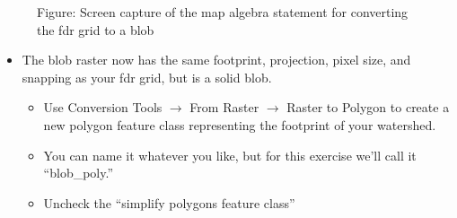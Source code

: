 \documentclass[letterpaper,10pt,english]{sphinxmanual}
\begin{document}
\begin{figure}[htbp]
\centering
\capstart

\noindent{}
\caption{Figure: Screen capture of the map algebra statement for converting the fdr grid to a blob}\label{\detokenize{ex_2:id17}}\end{figure}
\begin{itemize}
\item {} 
The blob raster now has the same footprint, projection, pixel size, and snapping as your fdr grid, but is a solid blob.
\begin{itemize}
\item {} 
Use Conversion Tools \(\rightarrow\) From Raster \(\rightarrow\) Raster to Polygon to create a new polygon feature class representing the footprint of your watershed.

\item {} 
You can name it whatever you like, but for this exercise we’ll call it “blob\_poly.”

\item {} 
Uncheck the “simplify polygons feature class”

\end{itemize}

\end{itemize}
\end{document}

